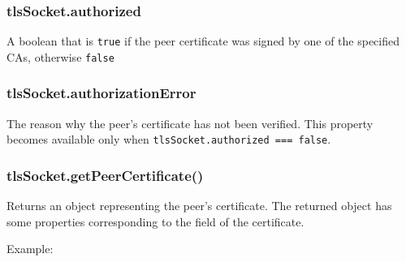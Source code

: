 \subsubsection{tlsSocket.authorized}

A boolean that is \texttt{true} if the peer certificate was signed by
one of the specified CAs, otherwise \texttt{false}

\subsubsection{tlsSocket.authorizationError}

The reason why the peer's certificate has not been verified. This
property becomes available only when
\texttt{tlsSocket.authorized === false}.

\subsubsection{tlsSocket.getPeerCertificate()}

Returns an object representing the peer's certificate. The returned
object has some properties corresponding to the field of the
certificate.

Example:

\begin{Shaded}
\begin{Highlighting}[]
\NormalTok{\{ }\NormalTok{: }
   \NormalTok{\{ }\NormalTok{: }\NormalTok{,}
     \NormalTok{: }\NormalTok{,}
     \NormalTok{: }\NormalTok{,}
     \NormalTok{: }\NormalTok{,}
     \NormalTok{: }\NormalTok{,}
     \NormalTok{: } \NormalTok{\},}
  \NormalTok{: }
   \NormalTok{\{ }\NormalTok{: }\NormalTok{,}
     \NormalTok{: }\NormalTok{,}
     \NormalTok{: }\NormalTok{,}
     \NormalTok{: }\NormalTok{,}
     \NormalTok{: }\NormalTok{,}
     \NormalTok{: } \NormalTok{\},}
  \NormalTok{: }\NormalTok{,}
  \NormalTok{: }\NormalTok{,}
  \NormalTok{: } \NormalTok{\}}
\end{Highlighting}
\end{Shaded}

